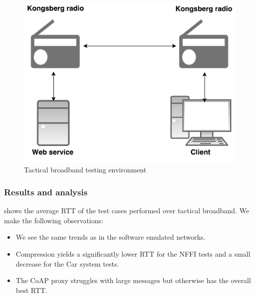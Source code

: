 \begin{figure}[h]
\centering
\includegraphics[scale=0.6]{images/radio_testing_environment.pdf}
\caption{Tactical broadband testing environment}
\label{figure-radio-testing-environment}
\end{figure}

\subsubsection{Results and analysis}

 shows the average RTT of the test cases
performed over tactical broadband. We make the following observations:

\begin{itemize}

    \item We see the same trends as in the software emulated networks.

    \item Compression yields a significantly lower RTT for the NFFI tests and a
    small decrease for the Car system tests.

    \item The CoAP proxy struggles with large messages but otherwise has the
    overall best RTT.

\end{itemize}

